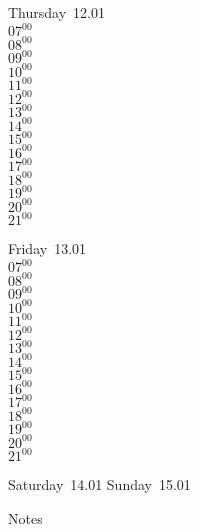 \documentclass[11pt,a4paper]{book}\usepackage[]{graphicx}\usepackage[]{color}
\begin{document}
\clearpage
\begin{headerbox}
\end{headerbox}
\begin{weekdaybox}
  Thursday~12.01\\
  { 
  \vfill
  $07^{00}$\\
$08^{00}$\\
$09^{00}$\\
$10^{00}$\\
$11^{00}$\\
$12^{00}$\\
$13^{00}$\\
$14^{00}$\\
$15^{00}$\\
$16^{00}$\\
$17^{00}$\\
$18^{00}$\\
$19^{00}$\\
$20^{00}$\\
$21^{00}$\\
  }
\end{weekdaybox} 
\begin{weekdaybox}
  Friday~13.01\\
  { 
  \vfill
  $07^{00}$\\
$08^{00}$\\
$09^{00}$\\
$10^{00}$\\
$11^{00}$\\
$12^{00}$\\
$13^{00}$\\
$14^{00}$\\
$15^{00}$\\
$16^{00}$\\
$17^{00}$\\
$18^{00}$\\
$19^{00}$\\
$20^{00}$\\
$21^{00}$\\
  }
\end{weekdaybox}
\begin{weekendbox}
  Saturday~14.01
  \tcblower
  Sunday~15.01
\end{weekendbox} %
\begin{notebox}
  Notes
\end{notebox}
\clearpage
\end{document}
